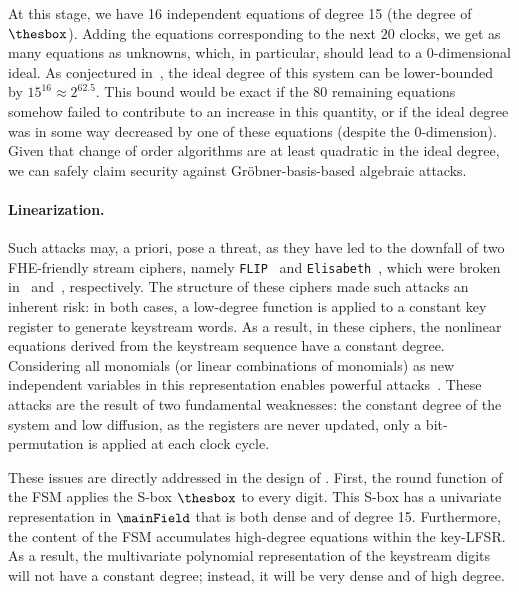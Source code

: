 At this stage, we have 16 independent equations of degree 15 (the degree of $\thesbox$). Adding the equations corresponding to the next $20$ clocks, we get as many equations as unknowns, which, in particular, should lead to a 0-dimensional ideal. As conjectured in~\cite{EPRINT:Perrin24}, the ideal degree of this system can be lower-bounded by $15^{16} \approx 2^{62.5}$. This bound would be exact if the 80 remaining equations somehow failed to contribute to an increase in this quantity, or if the ideal degree was in some way decreased by one of these equations (despite the 0-dimension). Given that change of order algorithms are at least quadratic in the ideal degree, we can safely claim security against Gröbner-basis-based algebraic attacks.



\paragraph{Linearization.}Such attacks may, a priori, pose a threat, as they have led to the downfall of two \gls{FHE}-friendly stream ciphers, namely {\tt FLIP}~\cite{EC:MJSC16} and {\tt Elisabeth}~\cite{AC:CHMS22}, which were broken in~\cite{C:DuvLalRot16} and~\cite{AC:GBJR23}, respectively. The structure of these ciphers made such attacks an inherent risk: in both cases, a low-degree function is applied to a constant key register to generate keystream words.  As a result, in these ciphers, the nonlinear equations derived from the keystream sequence have a constant degree. Considering all monomials (or linear combinations of monomials) as new independent variables in this representation enables powerful attacks~\cite{C:DuvLalRot16,AC:GBJR23}. These attacks are the result of  two fundamental weaknesses: the constant degree of the system and low diffusion, as the registers are never updated, only a bit-permutation is applied at each clock cycle.

These issues are directly addressed in the design of \coolName{}. First, the round function of the FSM applies the \gls{S-box} \( \thesbox \) to every digit. This \gls{S-box} has a univariate representation in \( \mainField \) that is both dense and of degree 15. Furthermore, the content of the FSM accumulates high-degree equations within the key-LFSR. As a result, the multivariate polynomial representation of the keystream digits will not have a constant degree; instead, it will be very dense and of high degree.


